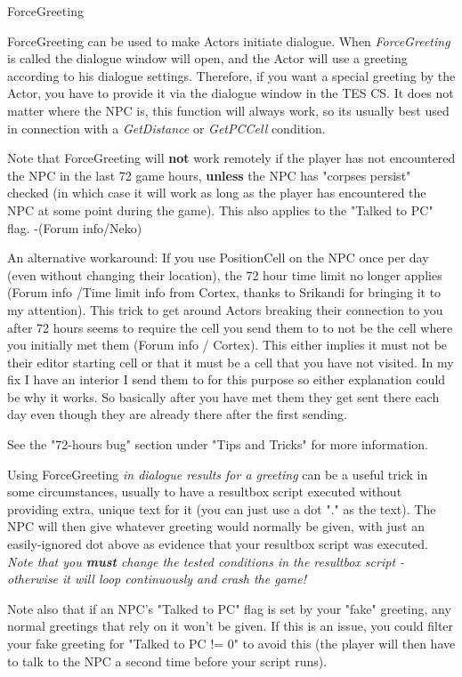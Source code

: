\documentclass[
]{article}
\begin{document}
ForceGreeting

ForceGreeting can be used to make Actors initiate dialogue. When
\emph{ForceGreeting} is called the dialogue window will open, and the
Actor will use a greeting according to his dialogue settings. Therefore,
if you want a special greeting by the Actor, you have to provide it via
the dialogue window in the TES CS. It does not matter where the NPC is,
this function will always work, so its usually best used in connection
with a \emph{GetDistance} or \emph{GetPCCell} condition.

Note that ForceGreeting will \textbf{not} work remotely if the player
has not encountered the NPC in the last 72 game hours, \textbf{unless}
the NPC has "corpses persist" checked (in which case it will work as
long as the player has encountered the NPC at some point during the
game). This also applies to the "Talked to PC" flag. -(Forum info/Neko)

An alternative workaround: If you use PositionCell on the NPC once per
day (even without changing their location), the 72 hour time limit no
longer applies (Forum info /Time limit info from Cortex, thanks to
Srikandi for bringing it to my attention). This trick to get around
Actors breaking their connection to you after 72 hours seems to require
the cell you send them to to not be the cell where you initially met
them (Forum info / Cortex). This either implies it must not be their
editor starting cell or that it must be a cell that you have not
visited. In my fix I have an interior I send them to for this purpose so
either explanation could be why it works. So basically after you have
met them they get sent there each day even though they are already there
after the first sending.

See the "72-hours bug" section under "Tips and Tricks" for more
information.

Using ForceGreeting \emph{in dialogue results for a greeting} can be a
useful trick in some circumstances, usually to have a resultbox script
executed without providing extra, unique text for it (you can just use a
dot "." as the text). The NPC will then give whatever greeting would
normally be given, with just an easily-ignored dot above as evidence
that your resultbox script was executed. \emph{Note that you
\textbf{must} change the tested conditions in the resultbox script -
otherwise it will loop continuously and crash the game!}

Note also that if an NPC's "Talked to PC" flag is set by your "fake"
greeting, any normal greetings that rely on it won't be given. If this
is an issue, you could filter your fake greeting for "Talked to PC != 0"
to avoid this (the player will then have to talk to the NPC a second
time before your script runs).
\end{document}
